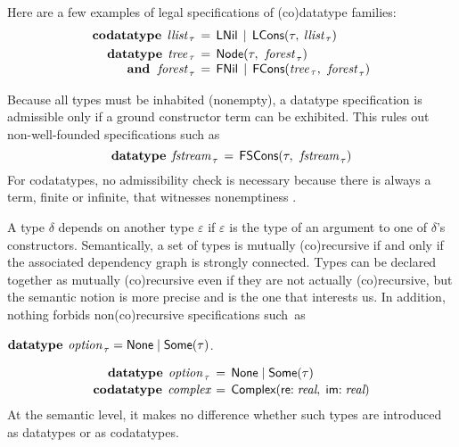 Here are a few examples of legal specifications of (co)datatype families:
\[\begin{aligned}[t]
      \keyw{codatatype}\; \,\ty{llist}_{\,\tau} & \,=\, \const{LNil} \,\mid\, \const{LCons}(%
      \tau,\: %
      \ty{llist}_{\,\tau}) \\%
      \keyw{datatype}\;\, \ty{tree}_{\,\tau} & \,=\, \const{Node}(\tau,\:\, \ty{forest}_{\,\tau}) \\[-\jot]
      \keyw{and}\;\,\, \ty{forest}_{\,\tau} & \,=\, \const{FNil} \,\mid\, \const{FCons}(\ty{tree}_{\,\tau},\:\, \ty{forest}_{\,\tau})
\end{aligned}
\]

\begin{report}%
Because all types must be inhabited (nonempty), a datatype specification is
admissible only if a ground constructor term can be exhibited.
This rules out non-well-founded specifications such as
\[\textbf{datatype}\;\, \textit{fstream}_{\,\tau} \,=\, \textsf{FSCons}(\tau,\:\, \textit{fstream}_{\,\tau})\]
For codatatypes, no admissibility check is necessary because there is always a term,
finite or infinite, that witnesses nonemptiness \cite{blanchette-et-al-2015-esop}.
\end{report}

A type $\delta$ depends on another type $\varepsilon$ if $\varepsilon$ is the
type of an argument to one of $\delta$'s constructors. Semantically, a set of
types is mutually (co)recursive if and only if the associated dependency graph
is strongly connected. Types can be declared together as mutually
(co)recursive even if they are not actually (co)recursive, but the
semantic notion is more precise and is the one that interests us.
%
In addition, nothing forbids non(co)recursive specifications
such~as
\begin{paper}%
\vthinspace$\keyw{datatype}~\vthinspace\ty{option}_{\,\tau} = \const{None} \mid \const{Some}(\tau)$.%
\end{paper}%
\begin{report}%
\[\begin{aligned}[t]
      \textbf{datatype}\;\, \textit{option}_{\,\tau} & \,=\, \textsf{None} \mid \textsf{Some}(\tau) \\[-.5\jot]
      \textbf{codatatype}\; \,\textit{complex} & \,=\, \textsf{Complex}(\textsf{re}{:}\; \textit{real},\; \textsf{im}{:}\;\textit{real})
\end{aligned}
\]
At the semantic level, it makes no difference whether such types are
introduced as datatypes or as codatatypes.
\end{report}%

